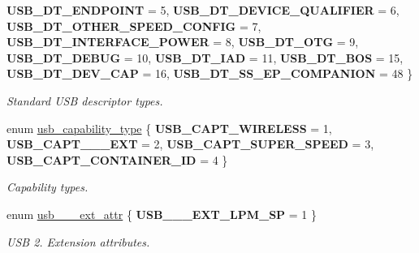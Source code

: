 \begin{DoxyCompactItemize}
\newline
{\bfseries U\+S\+B\+\_\+\+D\+T\+\_\+\+E\+N\+D\+P\+O\+I\+NT} = 5, 
{\bfseries U\+S\+B\+\_\+\+D\+T\+\_\+\+D\+E\+V\+I\+C\+E\+\_\+\+Q\+U\+A\+L\+I\+F\+I\+ER} = 6, 
{\bfseries U\+S\+B\+\_\+\+D\+T\+\_\+\+O\+T\+H\+E\+R\+\_\+\+S\+P\+E\+E\+D\+\_\+\+C\+O\+N\+F\+IG} = 7, 
{\bfseries U\+S\+B\+\_\+\+D\+T\+\_\+\+I\+N\+T\+E\+R\+F\+A\+C\+E\+\_\+\+P\+O\+W\+ER} = 8, 
\newline
{\bfseries U\+S\+B\+\_\+\+D\+T\+\_\+\+O\+TG} = 9, 
{\bfseries U\+S\+B\+\_\+\+D\+T\+\_\+\+D\+E\+B\+UG} = 10, 
{\bfseries U\+S\+B\+\_\+\+D\+T\+\_\+\+I\+AD} = 11, 
{\bfseries U\+S\+B\+\_\+\+D\+T\+\_\+\+B\+OS} = 15, 
\newline
{\bfseries U\+S\+B\+\_\+\+D\+T\+\_\+\+D\+E\+V\+\_\+\+C\+AP} = 16, 
{\bfseries U\+S\+B\+\_\+\+D\+T\+\_\+\+S\+S\+\_\+\+E\+P\+\_\+\+C\+O\+M\+P\+A\+N\+I\+ON} = 48
 \}\begin{DoxyCompactList}\small\item\em Standard U\+SB descriptor types. \end{DoxyCompactList}
\item 
\mbox{\label{group__usb__protocol__group_gab4eef94a7d2be2570193c4f9400a6fa6}} 
enum \hyperlink{group__usb__protocol__group_gab4eef94a7d2be2570193c4f9400a6fa6}{usb\+\_\+capability\+\_\+type} \{ {\bfseries U\+S\+B\+\_\+\+C\+A\+P\+T\+\_\+\+W\+I\+R\+E\+L\+E\+SS} = 1, 
{\bfseries U\+S\+B\+\_\+\+C\+A\+P\+T\+\_\+\_\+\_\+\+E\+XT} = 2, 
{\bfseries U\+S\+B\+\_\+\+C\+A\+P\+T\+\_\+\+S\+U\+P\+E\+R\+\_\+\+S\+P\+E\+ED} = 3, 
{\bfseries U\+S\+B\+\_\+\+C\+A\+P\+T\+\_\+\+C\+O\+N\+T\+A\+I\+N\+E\+R\+\_\+\+ID} = 4
 \}\begin{DoxyCompactList}\small\item\em Capability types. \end{DoxyCompactList}
\item 
\mbox{\label{group__usb__protocol__group_gab91aeaf1666bcc324f087f04fc896b7b}} 
enum \hyperlink{group__usb__protocol__group_gab91aeaf1666bcc324f087f04fc896b7b}{usb\+\_\+\_\+\_\+ext\+\_\+attr} \{ {\bfseries U\+S\+B\+\_\+\_\+\_\+\+E\+X\+T\+\_\+\+L\+P\+M\+\_\+\+SP} = 1
 \}\begin{DoxyCompactList}\small\item\em U\+SB 2. Extension attributes. \end{DoxyCompactList}
\item 
\mbox{\label{group__usb__protocol__group_ga83fdfa2cd4ff3a5ea7c8d6806f3d5685}} 

\end{DoxyCompactItemize}
